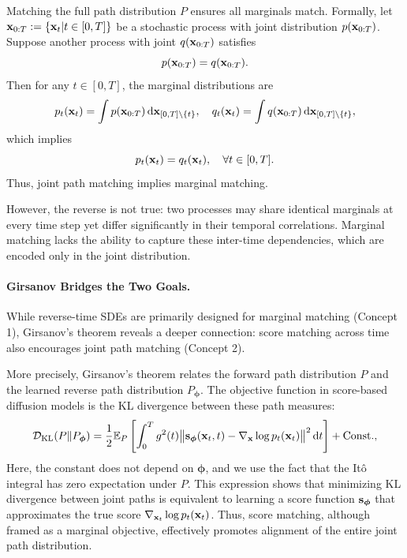 Matching the full path distribution $P$ ensures all marginals match. Formally, let ${\mathbf{x}}_{0:T} := \{{\mathbf{x}}_t|t \in [0,T]\}$ be a stochastic process with joint distribution $p({\mathbf{x}}_{0:T})$. Suppose another process with joint $q({\mathbf{x}}_{0:T})$ satisfies
$$ p({\mathbf{x}}_{0:T}) = q({\mathbf{x}}_{0:T}). $$
Then for any $t \in [0,T]$, the marginal distributions are
\begin{align*}
p_t({\mathbf{x}}_t) = \int p({\mathbf{x}}_{0:T})  \mathop{}\!\mathrm{d}{\mathbf{x}}_{[0,T]\setminus \{t\}}, \quad 
q_t({\mathbf{x}}_t) = \int q({\mathbf{x}}_{0:T})  \mathop{}\!\mathrm{d}{\mathbf{x}}_{[0,T]\setminus \{t\}},
\end{align*}
which implies
$$ p_t({\mathbf{x}}_t) = q_t({\mathbf{x}}_t), \quad \forall t \in [0,T]. $$
Thus, joint path matching implies marginal matching.

However, the reverse is not true: two processes may share identical marginals at every time step yet differ significantly in their temporal correlations. Marginal matching lacks the ability to capture these inter-time dependencies, which are encoded only in the joint distribution.


\paragraph{Girsanov Bridges the Two Goals.}
While reverse-time SDEs are primarily designed for marginal matching (Concept 1), Girsanov's theorem reveals a deeper connection: score matching across time also encourages joint path matching (Concept 2).

More precisely, Girsanov’s theorem relates the forward path distribution $P$ and the learned reverse path distribution $P_{\bm{\phi}}$. The objective function in score-based diffusion models is the KL divergence between these path measures:
\begin{align}\label{eq:girsanov-KL} \mathcal{D}_{\mathrm{KL}}(P  \|  P_{\bm{\phi}}) =  \frac{1}{2} \mathbb{E}_{P} \left[\int_{0}^{T} g^2(t) \big\|{\mathbf{s}}_{\bm{\phi}}({\mathbf{x}}_t,t) - \nabla_{{\mathbf{x}}}\log p_t({\mathbf{x}}_t)\big\|^2 \mathop{}\!\mathrm{d} t\right] + \mathrm{Const.}, \end{align}
Here, the constant does not depend on $\bm{\phi}$, and we use the fact that the It\^o integral has zero expectation under $P$. This expression shows that minimizing KL divergence between joint paths is equivalent to learning a score function ${\mathbf{s}}_{\bm{\phi}}$ that approximates the true score $\nabla_{{\mathbf{x}}_t} \log p_t({\mathbf{x}}_t)$. Thus, score matching, although framed as a marginal objective, effectively promotes alignment of the entire joint path distribution.

